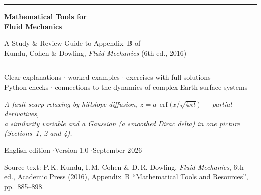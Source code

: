 \documentclass[11pt,letterpaper]{article}
\numberwithin{equation}{section}
\newcommand{\units}[1]{\,\mathrm{#1}}
\DeclareMathOperator{\erf}{erf}
\begin{document}
\begin{titlepage}
\centering
\vspace*{0.8cm}
{\color{keyblue}\rule{\linewidth}{1.4pt}}\par\vspace{0.7cm}
{\fontsize{30}{36}\selectfont\bfseries\color{keyblue} Mathematical Tools for\\[0.2em] Fluid Mechanics\par}
\vspace{0.5cm}
{\Large A Study \& Review Guide to Appendix~B of\\[0.2em]
Kundu, Cohen \& Dowling, \emph{Fluid Mechanics} (6th ed., 2016)\par}
\vspace{0.6cm}
{\color{keyblue}\rule{\linewidth}{1.4pt}}\par
\vspace{0.7cm}
{\large Clear explanations $\cdot$ worked examples $\cdot$ exercises with full solutions\\[0.2em]
Python checks $\cdot$ connections to the dynamics of complex Earth-surface systems\par}
\vspace{1.0cm}
\par
{\small\itshape A fault scarp relaxing by hillslope diffusion, $z=a\,\erf\!\big(x/\sqrt{4\kappa t}\big)$ --- partial derivatives,\\
a similarity variable and a Gaussian (a smoothed Dirac delta) in one picture (Sections~1, 2 and 4).\par}
\vfill
{\large English edition \quad$\cdot$\quad Version 1.0 \quad$\cdot$\quad September 2026\par}
\vspace{0.4cm}
{\small Source text: P.\,K. Kundu, I.\,M. Cohen \& D.\,R. Dowling, \emph{Fluid Mechanics}, 6th ed.,
Academic Press (2016), Appendix~B ``Mathematical Tools and Resources'', pp.~885--898.\par}
\end{titlepage}
\end{document}
